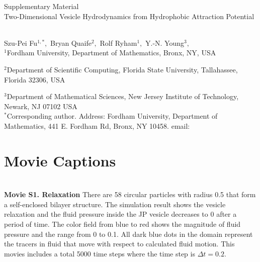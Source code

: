 
\thispagestyle{empty}

\newpage
{\Large \bf

  \noindent Supplementary Material\\

  \noindent 
  Two-Dimensional Vesicle Hydrodynamics from Hydrophobic Attraction Potential}\\

\noindent 
Szu-Pei Fu$^{1,*},$ 
Bryan Quaife$^{2},$ 
Rolf Ryham$^{1},$ 
Y.-N. Young$^{3},$
\\


\noindent
$^{1}$Fordham University, Department of Mathematics,  Bronx, NY, USA

\noindent
$^{2}$Department of Scientific Computing, Florida State University, Tallahassee, Florida 32306, USA

\noindent
$^{3}$Department of Mathematical Sciences, New Jersey Institute of Technology, Newark, NJ  07102 USA
\\

\noindent $^*$Corresponding author. Address: Fordham University, Department of Mathematics, 441 E. Fordham Rd, Bronx, NY 10458. email: 



\setcounter{page}{1}

\setcounter{figure}{0}
\renewcommand{\thefigure}{S\arabic{figure}}

\setcounter{equation}{0}
\renewcommand{\theequation}{S\arabic{equation}}

\setcounter{section}{0}
\renewcommand{\thesection}{S\arabic{section}}   





\sloppy
\section{Movie Captions}\mbox{} \\

\noindent
{\bf Movie S1. Relaxation} There are 58 circular particles with radius 0.5 that form a self-enclosed bilayer structure. The simulation result shows the vesicle relaxation and the fluid pressure inside the JP vesicle decreases to 0 after a period of time.
The color field from blue to red shows the magnitude of fluid pressure and the range from 0 to 0.1. All dark blue dots in the domain represent the tracers in fluid that move with respect to calculated fluid motion.
This movies includes a total 5000 time steps where the time step is $\Delta t=0.2$.\\



